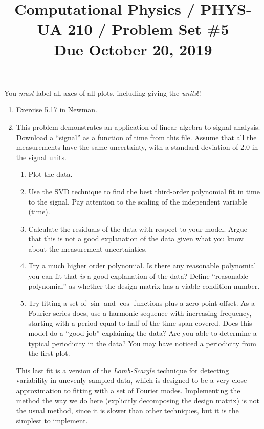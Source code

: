 \documentclass[11pt, preprint]{aastex}
\begin{document}
\title{\bf Computational Physics / PHYS-UA 210 / Problem Set \#5
\\ Due October 20, 2019 }

You {\it must} label all axes of all plots, including giving the {\it
  units}!!

\begin{enumerate}
  \item Exercise 5.17 in Newman.
  \item This problem demonstrates an application of linear algebra to
    signal analysis. Download a ``signal'' as a function of time from
    \href{https://github.com/blanton144/computational-grad/blob/main/data/signal.dat}{this
      file}. Assume that all the measurements have the same
    uncertainty, with a standard deviation of 2.0 in the signal units.
    \begin{enumerate}
      \item Plot the data.
      \item Use the SVD technique to find the best third-order
        polynomial fit in time to the signal. Pay attention to the
        scaling of the independent variable (time).
      \item Calculate the residuals of the data with respect to your
        model. Argue that this is not a good explanation of the data
        given what you know about the measurement uncertainties.
      \item Try a much higher order polynomial. Is there any
        reasonable polynomial you can fit that {\it is} a good
        explanation of the data? Define ``reasonable polynomial'' as
        whether the design matrix has a viable condition number.
      \item Try fitting a set of $\sin$ and $\cos$ functions plus a
        zero-point offset. As a Fourier series does, use a harmonic
        sequence with increasing frequency, starting with a period
        equal to half of the time span covered. Does this model do a
        ``good job'' explaining the data? Are you able to determine a
        typical periodicity in the data? You may have noticed a
        periodicity from the first plot.
    \end{enumerate}
    This last fit is a version of the {\it Lomb-Scargle} technique for
    detecting variability in unevenly sampled data, which is designed
    to be a very close approximation to fitting with a set of Fourier
    modes. Implementing the method the way we do here (explicitly
    decomposing the design matrix) is not the usual method, since it
    is slower than other techniques, but it is the simplest to
    implement.
\end{enumerate}
\end{document}
